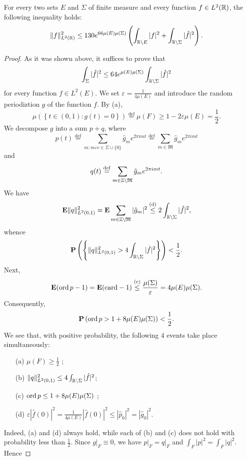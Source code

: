   \begin{theorem}
    For every two sets $E$ and $\Sigma$ of finite measure and every function $f\in L^2(\mathbb{R})$, the following inequality holds:
    \[
      \|f\|^2_{L^2(\mathbb{R})}\le 130e^{66\mu(E)\mu(\Sigma)}\left( \int_{\mathbb{R}\backslash E}|f|^2+\int_{\mathbb{R}\backslash \Sigma}|\hat{f}|^2 \right) .
    \] 
  \end{theorem}
  \begin{proof}
    As it was shown above, it suffices to prove that 
    \[
      \int_{\Sigma}|\hat{f}|^2\le 64e^{\mu(E)\mu(\Sigma)}\int_{\mathbb{R}\backslash \Sigma}|\hat{f}|^2
    \] 
    for every function $f\in L^2(E)$. We set $\varepsilon =\frac{1}{4\mu(E)}$ and introduce the random periodiztion $g$ of the function $f$. By (a), 
    \[
      \mu\left( \left\{ t\in (0,1):g(t)=0 \right\}  \right) \overset{\mathrm{def}}{=}\mu(F)\ge 1-2\varepsilon \mu(E)=\frac{1}{2}.
    \] 
    We decompose $g$ into a sum $p+q$, where
    \[
      p(t)\overset{\mathrm{def}}{=}\sum_{m:m\varepsilon v\in \Sigma\cup \{0\} }^{} \hat{g}_me^{2\pi imt}\overset{\mathrm{def}}{=}\sum_{m\in\mathfrak{M} }^{} \hat{g}_me^{2\pi imt}
    \] 
    and 
     \[
       q(t)\overset{\mathrm{def}}{=}\sum_{m\in \mathbb{Z}\backslash \mathfrak{M}}^{} \hat{g}_me^{2\pi i mt}. 
    \] 
    We have 
    \[
      \mathbf{E}\|q\|^2_{L^2(0,1)}=\mathbf{E}\sum_{m\in \mathbb{Z}\backslash \mathfrak{M}}^{} |\hat{g}_m|^2\overset{\mathrm{(d)}}{\le }2\int_{\mathbb{R}\backslash \Sigma}|\hat{f}|^2,
    \] 
    whence
    \[
      \mathbf{P}\left( \left\{ \|q\|^2_{L^2(0,1)}>4\int_{\mathbb{R}\backslash \Sigma}|\hat{f}|^2 \right\}  \right) <\frac{1}{2}. 
    \] 
    Next, 
    \[
      \mathbf{E}(\operatorname{ord} p -1)=\mathbf{E}(\mathrm{card}-1)\overset{\mathrm{(c)}}{\le } \frac{\mu(\Sigma)}{\varepsilon }=4\mu(E)\mu(\Sigma).
    \] 
    Consequently, 
    \[
      \mathbf{P}\left( \operatorname{ord} p>1+8\mu(E)\mu(\Sigma)  \right) <\frac{1}{2}.
    \] 
    We see that, with positive probability, the following $4$ events take place simultaneously:
    \begin{enumerate}
      \item [(a)] $\mu(F)\ge \frac{1}{2}$ ;
      \item [(b)] $\|q\|^2_{L^2(0,1)}\le 4\int_{\mathbb{R}\backslash \Sigma}|\hat{f}|^2$;
      \item [(c)] $\operatorname{ord} p\le 1+8\mu(E)\mu(\Sigma)$ ;
      \item [(d)] $\varepsilon |\hat{f}(0)|^2=\frac{1}{4\mu(E)}|\hat{f}(0)|^2\le |\hat{p}_0|^2=|\hat{g}_0|^2$.
    \end{enumerate}
    Indeed, (a) and (d) always hold, while each of (b) and (c) does not hold with probability less than $\frac{1}{2}$. Since $g\lvert_{F}\equiv 0 $, we have $p\lvert_{F}=q\lvert_{F}$ and $\int_{F}|p|^2=\int_{F}|q|^2$. Hence 

\end{proof}
